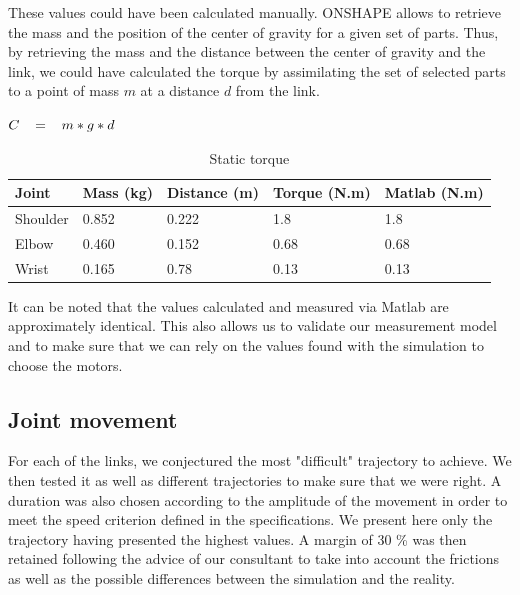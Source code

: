 \bigbreak
These values could have been calculated manually. ONSHAPE allows to retrieve the mass and the position of the center of gravity for a given set of parts. Thus, by retrieving the mass and the distance between the center of gravity and the link, we could have calculated the torque by assimilating the set of selected parts to a point of mass $m$ at a distance $d$ from the link.
\begin{center}
    $C\hspace*{0.3cm}=\hspace*{0.3cm}m*g*d$
\end{center}
\begin{table}[ht]
    \centering
    \begin{tabular}{|p{1.5cm} | p{2cm} | p{2.5cm}| p{2.7cm} | p{2.7cm} |} 
        \hline
        \textbf{Joint} & \textbf{Mass (kg)} & \textbf{Distance (m)}& \textbf{Torque (N.m)}& \textbf{Matlab (N.m)}\\ [0.3ex] 
        \hline
        Shoulder & 0.852 & 0.222 & 1.8 & 1.8 \\ 
        \hline
        Elbow & 0.460 & 0.152 & 0.68 & 0.68 \\ 
        \hline
        Wrist & 0.165 & 0.78 & 0.13 & 0.13 \\ 
        \hline
    \end{tabular}
    \caption{Static torque}
\end{table}
\FloatBarrier

\bigbreak
It can be noted that the values calculated and measured via Matlab are approximately identical. This also allows us to validate our measurement model and to make sure that we can rely on the values found with the simulation to choose the motors.

\subsection{Joint movement}

For each of the links, we conjectured the most "difficult" trajectory to achieve. We then tested it as well as different trajectories to make sure that we were right. A duration was also chosen according to the amplitude of the movement in order to meet the speed criterion defined in the specifications. We present here only the trajectory having presented the highest values. A margin of 30 \% was then retained following the advice of our consultant to take into account the frictions as well as the possible differences between the simulation and the reality.

